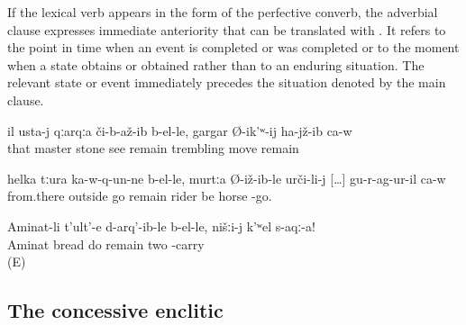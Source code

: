 If the lexical verb appears in the form of the perfective converb, the adverbial clause expresses immediate anteriority that can be translated with . It refers to the point in time when an event is completed or was completed or to the moment when a state obtains or obtained rather than to an enduring situation. The relevant state or event immediately precedes the situation denoted by the main clause.
%
\begin{exe}
	\ex	\label{ex:When / as soon as the master saw the stone, he trembled (started to tremble)}
	\gll	il	usta-j	qːarqːa	či-b-až-ib	b-el-le,	gargar	Ø-ik'ʷ-ij	ha-jž-ib	ca-w\\
		that	master	stone	see	remain	trembling	move	remain \\
	\glt	{}

	\ex	\label{ex:When / as soon as he went out from there, he mounted the horse}
	\gll	helka	tːura	ka-w-q-un-ne	b-el-le,	murtːa	Ø-iž-ib-le	urči-li-j [\ldots]	gu-r-ag-ur-il	ca-w\\
		from.there	outside	go	remain	rider	be	horse	{}	-go.	\\
	\glt	{}

	\ex	\label{ex:‎As soon as Aminat makes bread / finishes making bread}
	\gll	Aminat-li	t'ult'-e	d-arq'-ib-le	b-el-le,	nišːi-j	k'ʷel	s-aqː-a!\\
		Aminat	bread	do	remain		two	-carry\\
	\glt	{} (E)
\end{exe}



\subsection{The concessive enclitic  }
\label{sec:concessive enclitic =xar}

